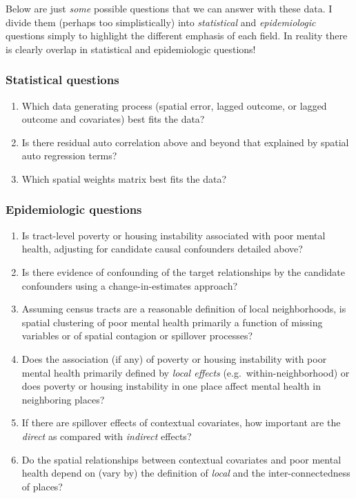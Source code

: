 \documentclass[
]{book}
\providecommand{\tightlist}{%
  \setlength{\itemsep}{0pt}\setlength{\parskip}{0pt}}
\begin{document}
Below are just \emph{some} possible questions that we can answer with these data. I divide them (perhaps too simplistically) into \emph{statistical} and \emph{epidemiologic} questions simply to highlight the different emphasis of each field. In reality there is clearly overlap in statistical and epidemiologic questions!

\hypertarget{statistical-questions}{%
\subsubsection{Statistical questions}\label{statistical-questions}}

\begin{enumerate}
\def\labelenumi{\arabic{enumi}.}
\tightlist
\item
  Which data generating process (spatial error, lagged outcome, or lagged outcome and covariates) best fits the data?
\item
  Is there residual auto correlation above and beyond that explained by spatial auto regression terms?
\item
  Which spatial weights matrix best fits the data?
\end{enumerate}

\hypertarget{epidemiologic-questions}{%
\subsubsection{Epidemiologic questions}\label{epidemiologic-questions}}

\begin{enumerate}
\def\labelenumi{\arabic{enumi}.}
\tightlist
\item
  Is tract-level poverty or housing instability associated with poor mental health, adjusting for candidate causal confounders detailed above?
\item
  Is there evidence of confounding of the target relationships by the candidate confounders using a change-in-estimates approach?
\item
  Assuming census tracts are a reasonable definition of local neighborhoods, is spatial clustering of poor mental health primarily a function of missing variables or of spatial contagion or spillover processes?
\item
  Does the association (if any) of poverty or housing instability with poor mental health primarily defined by \emph{local effects} (e.g.~within-neighborhood) or does poverty or housing instability in one place affect mental health in neighboring places?
\item
  If there are spillover effects of contextual covariates, how important are the \emph{direct} as compared with \emph{indirect} effects?
\item
  Do the spatial relationships between contextual covariates and poor mental health depend on (vary by) the definition of \emph{local} and the inter-connectedness of places?
\end{enumerate}
\end{document}
